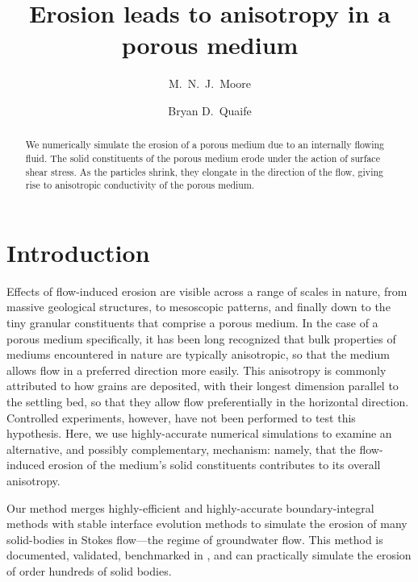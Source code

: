\documentclass[reprint,superscriptaddress,notitlepage]{revtex4-1}
\begin{document}
\title{Erosion leads to anisotropy in a porous medium}
%
\author{M.~N.~J.~Moore}
\author{Bryan D.~Quaife}
\begin{abstract}
We numerically simulate the erosion of a porous medium due to an internally flowing fluid. The solid constituents of the porous medium erode under the action of surface shear stress. As the particles shrink, they elongate in the direction of the flow, giving rise to anisotropic conductivity of the porous medium.
\end{abstract}
\maketitle

\section{Introduction}

Effects of flow-induced erosion are visible across a range of scales in nature, from massive geological structures, to mesoscopic patterns, and finally down to the tiny granular constituents that comprise a porous medium. In the case of a porous medium specifically, it has been long recognized that bulk properties of mediums encountered in nature are typically anisotropic, so that the medium allows flow in a preferred direction more easily. This anisotropy is commonly attributed to how grains are deposited, with their longest dimension parallel to the settling bed, so that they allow flow preferentially in the horizontal direction. Controlled experiments, however, have not been performed to test this hypothesis. Here, we use highly-accurate numerical simulations to examine an alternative, and possibly complementary, mechanism: namely, that the flow-induced erosion of the medium's solid constituents contributes to its overall anisotropy.

Our method merges highly-efficient and highly-accurate boundary-integral methods with stable interface evolution methods to simulate the erosion of many solid-bodies in Stokes flow---the regime of groundwater flow. This method is documented, validated, benchmarked in \cite{quaife2018boundary}, and can practically simulate the erosion of order hundreds of solid bodies.
\end{document}
